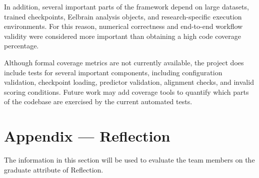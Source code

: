\documentclass[12pt, titlepage]{article}
\begin{document}
In addition, several important parts of the framework depend on large datasets, trained checkpoints, Eelbrain analysis objects, and research-specific execution environments.
For this reason, numerical correctness and end-to-end workflow validity were considered more important than obtaining a high code coverage percentage.

Although formal coverage metrics are not currently available, the project does include tests for several important components, including configuration validation, checkpoint loading, predictor validation, alignment checks, and invalid scoring conditions.
Future work may add coverage tools to quantify which parts of the codebase are exercised by the current automated tests.







\newpage{}
\section*{Appendix --- Reflection}

The information in this section will be used to evaluate the team members on the
graduate attribute of Reflection.


\end{document}
